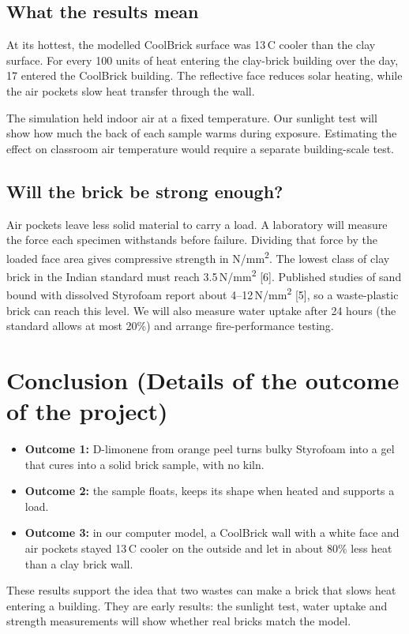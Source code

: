 \documentclass[11pt,a4paper]{article}
\begin{document}
\subsection{What the results mean}
At its hottest, the modelled CoolBrick surface was 13\,\textdegree C cooler than the clay
surface. For every 100 units of heat entering the clay-brick building over the
day, 17 entered the CoolBrick building. The reflective face reduces solar
heating, while the air pockets slow heat transfer through the wall.

The simulation held indoor air at a fixed temperature. Our sunlight test will
show how much the back of each sample warms during exposure. Estimating the
effect on classroom air temperature would require a separate building-scale test.

\subsection{Will the brick be strong enough?}
Air pockets leave less solid material to carry a load. A laboratory will
measure the force each specimen withstands before failure. Dividing that force
by the loaded face area gives compressive strength in N/mm\textsuperscript{2}.
The lowest class of clay brick in the Indian standard must reach 3.5\,N/mm\textsuperscript{2}
[6]. Published studies of sand bound with dissolved Styrofoam report about
4--12\,N/mm\textsuperscript{2} [5], so a waste-plastic brick can reach this level.
We will also measure water uptake after 24 hours (the standard allows at most
20\%) and arrange fire-performance testing.

\section{Conclusion (Details of the outcome of the project)}
\begin{itemize}[leftmargin=*,itemsep=3pt]
  \item \textbf{Outcome 1:} D-limonene from orange peel turns bulky Styrofoam
        into a gel that cures into a solid brick sample, with no kiln.
  \item \textbf{Outcome 2:} the sample floats, keeps its shape when heated and
        supports a load.
  \item \textbf{Outcome 3:} in our computer model, a CoolBrick wall with a white
        face and air pockets stayed 13\,\textdegree C cooler on the outside and let in
        about 80\% less heat than a clay brick wall.
\end{itemize}
These results support the idea that two wastes can make a brick that slows
heat entering a building. They are early results: the sunlight test, water
uptake and strength measurements will show whether real bricks match the model.
\end{document}
